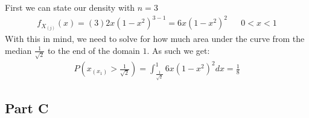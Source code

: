 \documentclass{article}
\begin{document}
First we can state our density with $n=3$
\begin{align*}
f_{X_{(j)}}(x) = (3) 2x (1-x^2)^{3-1} = 6x (1-x^2)^{2} && 0<x<1
\end{align*}
With this in mind, we need to solve for how much area under the curve from the median $\tfrac{1}{\sqrt{2}}$ to the end of the domain $1$. As such we get:
\begin{align*}
P(x_{(x_1)} > \tfrac{1}{\sqrt{2}}) = \int_{\tfrac{1}{\sqrt{2}}}^{1} 6x (1-x^2)^{2} dx = \frac{1}{8}
\end{align*}
\subsection*{Part C}
\end{document}
